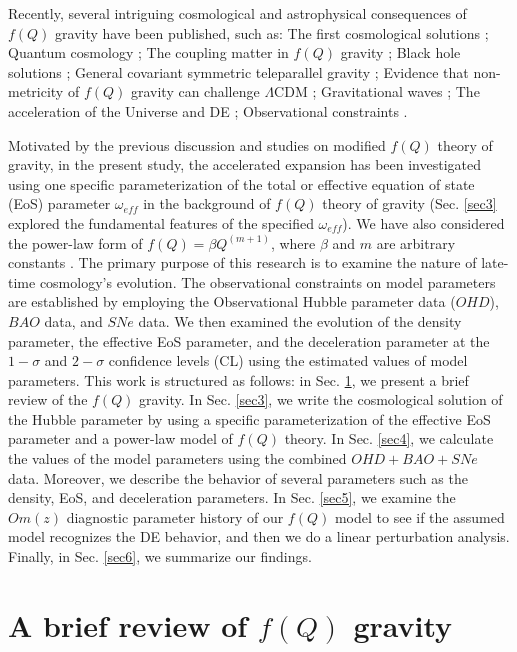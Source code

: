 \documentclass[prd,superscriptaddress,amsfonts,amssymb,amsmath,showpacs,twocolumn]{revtex4-2}
\begin{document}
Recently, several intriguing cosmological and astrophysical consequences of $f(Q)$ gravity have been published, such as: The first cosmological solutions \cite{Q1,Q2}; Quantum cosmology \cite{Q3}; The coupling matter in $f(Q)$ gravity \cite{Q4}; Black hole solutions \cite{Q5}; General covariant symmetric teleparallel gravity \cite{Q6}; Evidence that non-metricity of $f(Q)$ gravity can challenge $\Lambda$CDM \cite{Q7}; Gravitational waves \cite{Q8,Q9,Q10}; The acceleration of the Universe and DE \cite{ko1,ko2,ko3,ko4,ko5}; Observational constraints \cite{OC1, OC2, OC3}.

Motivated by the previous discussion and studies on modified $f(Q)$ theory of gravity, in the present study, the accelerated expansion has been investigated using one specific parameterization of the total or effective equation of state (EoS) parameter $\omega_{eff}$ in the background of $f(Q)$ theory of gravity (Sec. \ref{sec3} explored the fundamental features of the specified $\omega_{eff}$). We have also considered the power-law form of $f(Q)=\beta Q^{\left( m+1\right) }$,
where $\beta$ and $m$ are arbitrary constants \cite{Q4}. The primary purpose of this research is to examine the nature of late-time cosmology's evolution. The observational constraints on model parameters are established by employing the Observational Hubble parameter data ($OHD$), $BAO$ data, and $SNe$ data. We then examined the evolution of the density parameter, the effective EoS parameter, and the deceleration parameter at the $1-\sigma$ and $2-\sigma$ confidence levels (CL) using the estimated values of model parameters. This work is structured as follows: in Sec. \ref{sec2}, we present a brief review of the $f(Q)$ gravity. In Sec. \ref{sec3}, we write the cosmological solution of the Hubble parameter by using a specific parameterization of the effective EoS parameter and a power-law model of $f(Q)$ theory. In Sec. \ref{sec4}, we calculate the values of the model parameters using the combined $OHD+BAO+SNe$ data. Moreover, we describe the behavior of several parameters such as the density, EoS, and deceleration parameters. In Sec. \ref{sec5}, we examine the $Om(z)$ diagnostic parameter history of our $f(Q)$ model to see if the assumed model recognizes the DE behavior, and then we do a linear perturbation analysis. Finally, in Sec. \ref{sec6}, we summarize our findings.



\section{A brief review of $f(Q)$ gravity}
\label{sec2}
\end{document}
